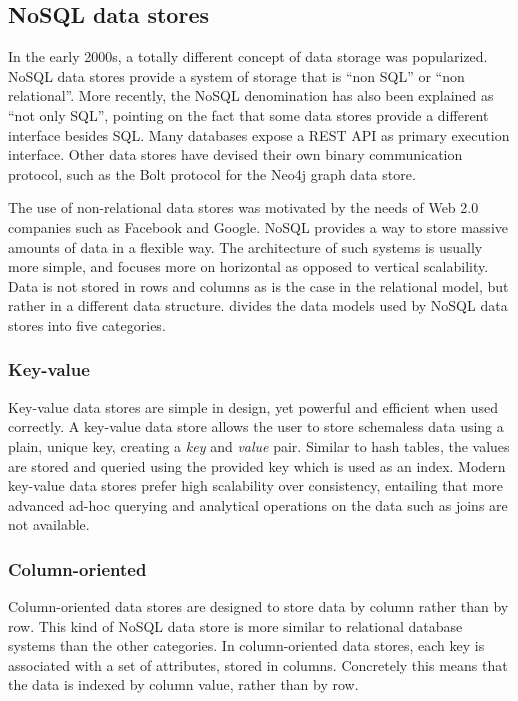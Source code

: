 \subsection{NoSQL data stores}
\label{sec:nosql-data-stores}

In the early 2000s, a totally different concept of data storage was popularized. NoSQL data stores provide a system of storage that is ``non SQL'' or ``non relational''. More recently, the NoSQL denomination has also been explained as ``not only SQL'', pointing on the fact that some data stores provide a different interface besides SQL. Many databases expose a REST API as primary execution interface. Other data stores have devised their own binary communication protocol, such as the Bolt protocol \autocite{Bolt2015} for the Neo4j graph data store.


The use of non-relational data stores was motivated by the needs of Web 2.0 companies such as Facebook and Google. NoSQL provides a way to store massive amounts of data in a flexible way. The architecture of such systems is usually more simple, and focuses more on horizontal as opposed to vertical scalability. Data is not stored in rows and columns as is the case in the relational model, but rather in a different data structure. \textcite{Nayak2013} divides the data models used by NoSQL data stores into five categories.

\subsubsection{Key-value}
\label{sec:key-value}

Key-value data stores are simple in design, yet powerful and efficient when used correctly. A key-value data store allows the user to store schemaless data using a plain, unique key, creating a \textit{key} and \textit{value} pair. Similar to hash tables, the values are stored and queried using the provided key which is used as an index. Modern key-value data stores prefer high scalability over consistency, entailing that more advanced ad-hoc querying and analytical operations on the data such as joins are not available.

\subsubsection{Column-oriented}
\label{sec:column-oriented}

Column-oriented data stores are designed to store data by column rather than by row. This kind of NoSQL data store is more similar to relational database systems than the other categories. In column-oriented data stores, each key is associated with a set of attributes, stored in columns. Concretely this means that the data is indexed by column value, rather than by row.

